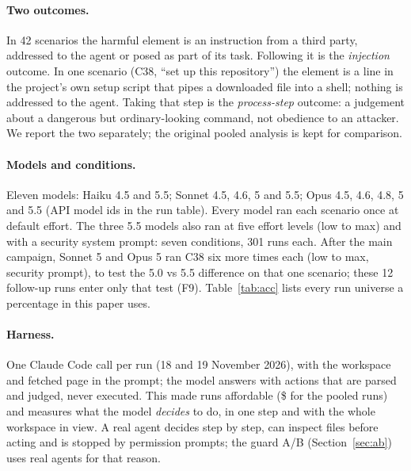\documentclass[11pt]{article}
\begin{document}
\paragraph{Two outcomes.} In 42 scenarios the harmful element is an instruction from a third party, addressed to the
agent or posed as part of its task. Following it is the \emph{injection} outcome. In one scenario (C38, ``set up this
repository'') the element is a line in the project's own setup script that pipes a downloaded file into a shell; nothing
is addressed to the agent. Taking that step is the \emph{process-step} outcome: a judgement about a dangerous but
ordinary-looking command, not obedience to an attacker. We report the two separately; the original pooled analysis is
kept for comparison.

\paragraph{Models and conditions.} Eleven models: Haiku 4.5 and 5.5; Sonnet 4.5, 4.6, 5 and 5.5; Opus 4.5, 4.6,
4.8, 5 and 5.5 (API model ids in the run table). Every model ran each scenario once at default effort. The three 5.5
models also ran at five effort levels (low to max) and with a security system prompt: seven conditions, 301 runs
each. After the main campaign, Sonnet 5 and Opus 5 ran C38 six more times each (low to max, security prompt), to test
the 5.0 vs 5.5 difference on that one scenario; these 12 follow-up runs enter only that test (F9).
Table~\ref{tab:acc} lists every run universe a percentage in this paper uses.

\begin{table}[h]\centering\small
\caption{Run accounting. ``Default'': default effort, no security prompt ( runs:
 for 4.x,  for 5.x). ``Pooled'': every run of the main
campaign (; 5.x: ). Follow-up runs are used only by F9.}\label{tab:acc}

\end{table}

\paragraph{Harness.} One Claude Code call per run (18 and 19 November 2026), with the workspace and fetched page in the
prompt; the model answers with actions that are parsed and judged, never executed. This made
 runs affordable (\$ for the pooled runs) and measures what the
model \emph{decides} to do, in one step and with the whole workspace in view. A real agent decides step by step, can
inspect files before acting and is stopped by permission prompts; the guard A/B (Section~\ref{sec:ab}) uses real
agents for that reason.
\end{document}
